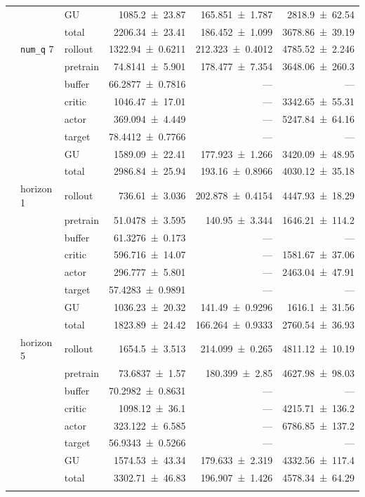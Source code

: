 {\begin{longtable}{@{}lllrrr@{}}
     &  & GU & \num{1085.2+-23.87} & \num{165.851+-1.787} & \num{2818.9+-62.54} \\
     &  & total & \num{2206.34+-23.41} & \num{186.452+-1.099} & \num{3678.86+-39.19} \\
    \addlinespace[2pt]
     & \texttt{num\_q} 7 & rollout & \num{1322.94+-0.6211} & \num{212.323+-0.4012} & \num{4785.52+-2.246} \\
     &  & pretrain & \num{74.8141+-5.901} & \num{178.477+-7.354} & \num{3648.06+-260.3} \\
     &  & buffer & \num{66.2877+-0.7816} & --- & --- \\
     &  & critic & \num{1046.47+-17.01} & --- & \num{3342.65+-55.31} \\
     &  & actor & \num{369.094+-4.449} & --- & \num{5247.84+-64.16} \\
     &  & target & \num{78.4412+-0.7766} & --- & --- \\
     &  & GU & \num{1589.09+-22.41} & \num{177.923+-1.266} & \num{3420.09+-48.95} \\
     &  & total & \num{2986.84+-25.94} & \num{193.16+-0.8966} & \num{4030.12+-35.18} \\
    \addlinespace[2pt]
     & horizon 1 & rollout & \num{736.61+-3.036} & \num{202.878+-0.4154} & \num{4447.93+-18.29} \\
     &  & pretrain & \num{51.0478+-3.595} & \num{140.95+-3.344} & \num{1646.21+-114.2} \\
     &  & buffer & \num{61.3276+-0.173} & --- & --- \\
     &  & critic & \num{596.716+-14.07} & --- & \num{1581.67+-37.06} \\
     &  & actor & \num{296.777+-5.801} & --- & \num{2463.04+-47.91} \\
     &  & target & \num{57.4283+-0.9891} & --- & --- \\
     &  & GU & \num{1036.23+-20.32} & \num{141.49+-0.9296} & \num{1616.1+-31.56} \\
     &  & total & \num{1823.89+-24.42} & \num{166.264+-0.9333} & \num{2760.54+-36.93} \\
    \addlinespace[2pt]
     & horizon 5 & rollout & \num{1654.5+-3.513} & \num{214.099+-0.265} & \num{4811.12+-10.19} \\
     &  & pretrain & \num{73.6837+-1.57} & \num{180.399+-2.85} & \num{4627.98+-98.03} \\
     &  & buffer & \num{70.2982+-0.8631} & --- & --- \\
     &  & critic & \num{1098.12+-36.1} & --- & \num{4215.71+-136.2} \\
     &  & actor & \num{323.122+-6.585} & --- & \num{6786.85+-137.2} \\
     &  & target & \num{56.9343+-0.5266} & --- & --- \\
     &  & GU & \num{1574.53+-43.34} & \num{179.633+-2.319} & \num{4332.56+-117.4} \\
     &  & total & \num{3302.71+-46.83} & \num{196.907+-1.426} & \num{4578.34+-64.29} \\
    \addlinespace[2pt]
  \end{longtable}
}
